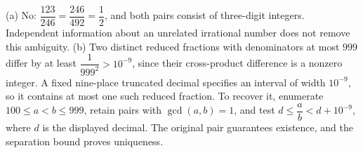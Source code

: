 (a) No: $\dfrac{123}{246}=\dfrac{246}{492}=\dfrac{1}{2}$, and both pairs consist of three-digit integers. Independent information about an unrelated irrational number does not remove this ambiguity. (b) Two distinct reduced fractions with denominators at most $999$ differ by at least $\dfrac{1}{999^2}>10^{-9}$, since their cross-product difference is a nonzero integer. A fixed nine-place truncated decimal specifies an interval of width $10^{-9}$, so it contains at most one such reduced fraction. To recover it, enumerate $100\le a<b\le999$, retain pairs with $\gcd(a,b)=1$, and test $d\le\dfrac{a}{b}<d+10^{-9}$, where $d$ is the displayed decimal. The original pair guarantees existence, and the separation bound proves uniqueness.

